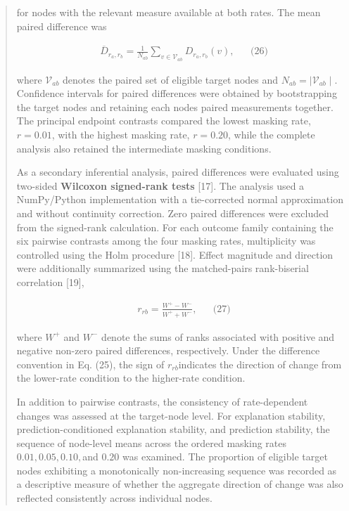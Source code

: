 \documentclass[a4paper]{article}
\begin{document}
\begin{quote}
for nodes with the relevant measure available at both rates. The mean
paired difference was

\[\begin{matrix}
 & {\overline{D}}_{r_{a},r_{b}} = \frac{1}{N_{ab}}\sum_{v \in \mathcal{V}_{ab}}^{}D_{r_{a},r_{b}}(v), & & \text{(26)}
\end{matrix}
\]

where \(\mathcal{V}_{ab}\) denotes the paired set of eligible target
nodes and \(N_{ab} = \mid \mathcal{V}_{ab} \mid\). Confidence intervals
for paired differences were obtained by bootstrapping the target nodes
and retaining each node\textquotesingle s paired measurements together.
The principal endpoint contrasts compared the lowest masking rate,
\(r = 0.01\), with the highest masking rate, \(r = 0.20\), while the
complete analysis also retained the intermediate masking conditions.

As a secondary inferential analysis, paired differences were evaluated
using two-sided \textbf{Wilcoxon signed-rank tests} {[}17{]}. The
analysis used a NumPy/Python implementation with a tie-corrected normal
approximation and without continuity correction. Zero paired differences
were excluded from the signed-rank calculation. For each outcome family
containing the six pairwise contrasts among the four masking rates,
multiplicity was controlled using the Holm procedure {[}18{]}. Effect
magnitude and direction were additionally summarized using the
matched-pairs rank-biserial correlation {[}19{]},

\[\begin{matrix}
 & r_{rb} = \frac{W^{+} - W^{-}}{W^{+} + W^{-}}, & & \text{(27)}
\end{matrix}
\]

where \(W^{+}\) and \(W^{-}\) denote the sums of ranks associated with
positive and negative non-zero paired differences, respectively. Under
the difference convention in Eq. (25), the sign of \(r_{rb}\)indicates
the direction of change from the lower-rate condition to the higher-rate
condition.

In addition to pairwise contrasts, the consistency of rate-dependent
changes was assessed at the target-node level. For explanation
stability, prediction-conditioned explanation stability, and prediction
stability, the sequence of node-level means across the ordered masking
rates \(0.01,0.05,0.10,\)and \(0.20\) was examined. The proportion of
eligible target nodes exhibiting a monotonically non-increasing sequence
was recorded as a descriptive measure of whether the aggregate direction
of change was also reflected consistently across individual nodes.


\end{quote}
\end{document}
